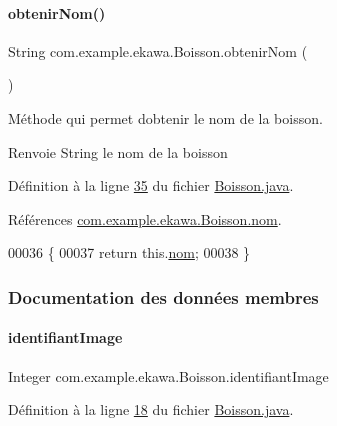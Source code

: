 \paragraph{\texorpdfstring{obtenir\+Nom()}{obtenirNom()}}
{\footnotesize\ttfamily String com.\+example.\+ekawa.\+Boisson.\+obtenir\+Nom (\begin{DoxyParamCaption}{ }\end{DoxyParamCaption})}



Méthode qui permet d\textquotesingle{}obtenir le nom de la boisson. 

\begin{DoxyReturn}{Renvoie}
String le nom de la boisson 
\end{DoxyReturn}


Définition à la ligne \hyperlink{_boisson_8java_source_l00035}{35} du fichier \hyperlink{_boisson_8java_source}{Boisson.\+java}.



Références \hyperlink{_boisson_8java_source_l00017}{com.\+example.\+ekawa.\+Boisson.\+nom}.


\begin{DoxyCode}
00036     \{
00037         \textcolor{keywordflow}{return} this.\hyperlink{classcom_1_1example_1_1ekawa_1_1_boisson_a9c932ca6665790c36acb6d4792a5a31a}{nom};
00038     \}
\end{DoxyCode}


\subsubsection{Documentation des données membres}
\mbox{\label{classcom_1_1example_1_1ekawa_1_1_boisson_ac73d259d39e459b00e5cfdf73a2aaf98}} 
\paragraph{\texorpdfstring{identifiant\+Image}{identifiantImage}}
{\footnotesize\ttfamily Integer com.\+example.\+ekawa.\+Boisson.\+identifiant\+Image\hspace{0.3cm}{\ttfamily [private]}}



Définition à la ligne \hyperlink{_boisson_8java_source_l00018}{18} du fichier \hyperlink{_boisson_8java_source}{Boisson.\+java}.



